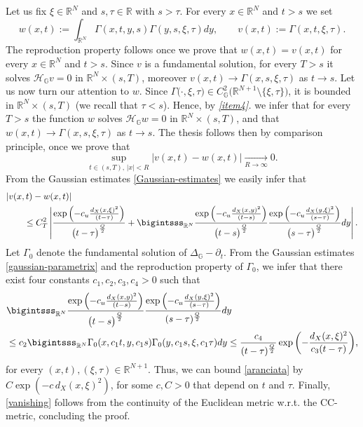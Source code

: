 \documentclass[11pt,a4paper]{article}
\numberwithin{equation}{section}
\newcommand{\R}{\mathbb{R}}
\def \rn {{\mathbb {R}}^{N}}
\def \rnn {{\mathbb {R}}^{N+1}}
\def \GG {{\mathbb{G}}}
\def \p {\partial}
\def \H {\mathscr{H}_\GG}
\def \G {{\Gamma}}
\def \t {{\tau}}
\def \x {{\xi}}
\begin{document}
\begin{pf-fundamental}
	
	Let us fix $\x\in\rn$ and $s,\t\in\R$ with $s>\t$. For every  $x\in\rn$ and $t>s$ we set
	\begin{equation}
		w(x,t):=\int_{\rn}\G(x,t,y,s)\G(y,s,\x,\t)dy,\qquad v(x,t):=\G(x,t,\x,\t).
	\end{equation}
	The reproduction property follows once we prove that $w(x,t)=v(x,t)$ for every $x \in \R^N$ and $t>s$. Since $v$ is a fundamental solution, for every $T>s$ it solves $\H v= 0$ in $\rn\times (s,T)$, moreover $v(x,t)\to \G(x,s,\x,\t)$ as $t\to s$. Let us now turn our attention to $w$. Since $\G\big(\cdot,\x,\t\big)\in C^2_\GG\big(\rnn\setminus\{\x,\t\}\big)$, it is bounded in $\rn\times (s,T)$ (we recall that $\t<s$). Hence, by \emph{\ref{item4}.} we infer that for every $T>s$ the function $w$ solves $\H w= 0$ in $\rn\times (s,T)$, and that $w(x,t)\to \G(x,s,\x,\t)$ as $t\to s$. The thesis follows then by comparison principle, once we prove that 
	\begin{equation}\label{vanishing}
		\sup_{t\in(s,T),\,|x|<R}|v(x,t)-w(x,t)|\underset{R\to \infty}\longrightarrow 0. 
	\end{equation}
	From the Gaussian estimates \eqref{Gaussian-estimates} we easily infer that
	\begin{equation}\label{aranciata}
		\begin{aligned}
			&|v(x,t)-w(x,t)|\\
			&\quad \quad\leq C_T^2\left| \frac{\exp{\left(-c_u\frac{d_X(x,\x)^2}{(t-\t)}\right)}}{\big(t-\t\big)^{\frac{Q}{2}}} + \bigintsss_{\rn}\frac{\exp{\left(-c_u\frac{d_X(x,y)^2}{(t-s)}\right)}}{\big(t-s\big)^{\frac{Q}{2}}} \frac{\exp{\left(-c_u\frac{d_X(y,\x)^2}{(s-\t)}\right)}}{\big(s-\t\big)^{\frac{Q}{2}}} dy \right|.
		\end{aligned}
	\end{equation}
	Let $\G_0$ denote the fundamental solution of $\Delta_\GG-\p_t$. From the Gaussian estimates \eqref{gaussian-parametrix} and the reproduction property of $\Gamma_0$, we infer that there exist four constants $c_1,c_2,c_3,c_4>0$ such that
	\begin{equation}\label{cioccolata-al-latte}
		\begin{aligned}
			&\bigintsss_{\rn}\frac{\exp{\left(-c_u\frac{d_X(x,y)^2}{(t-s)}\right)}}{\big(t-s\big)^{\frac{Q}{2}}}\frac{\exp{\left(-c_u\frac{d_X(y,\x)^2}{(s-\t)}\right)}}{(s-\t)^{\frac{Q}{2}}}dy\\&\leq c_2\bigintsss_{\rn}\G_0(x,c_1 t,y, c_1 s)\G_0(y, c_1 s,\x,c_1 \t)dy\leq \frac{c_4}{(t-\t)^{\frac{Q}{2}}}\exp{\left(-\frac{d_X(x,\x)^2}{c_3(t-\t)}\right)},
		\end{aligned}
	\end{equation} 	
	for every $(x,t),(\x,\t)\in\rnn$. Thus, we can bound \eqref{aranciata} by $C \exp\left(-c\,d_X(x,\x)^2\right)$,	for some $c,C>0$ that depend on $t$ and $\t$. Finally, \eqref{vanishing} follows from the continuity of the Euclidean metric w.r.t. the CC-metric, concluding the proof. 
	

\end{pf-fundamental}
\end{document}

